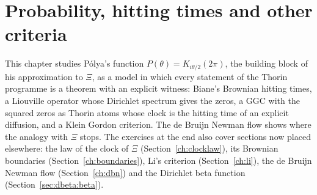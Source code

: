 \chapter{Probability, hitting times and other criteria}\label{chap:probability}

This chapter studies P\'olya's function $P(\theta)=K_{i\theta/2}(2\pi)$, the building block of his approximation to $\Xi$, as a model in which every statement of the Thorin programme is a theorem with an explicit witness: Biane's Brownian hitting times, a Liouville operator whose Dirichlet spectrum gives the zeros, a GGC with the squared zeros as Thorin atoms whose clock is the hitting time of an explicit diffusion, and a Klein Gordon criterion. The de Bruijn Newman flow shows where the analogy with $\Xi$ stops. The exercises at the end also cover sections now placed elsewhere: the law of the clock of $\Xi$ (Section~\ref{ch:clocklaw}), its Brownian boundaries (Section~\ref{ch:boundaries}), Li's criterion (Section~\ref{ch:li}), the de Bruijn Newman flow (Section~\ref{ch:dbn}) and the Dirichlet beta function (Section~\ref{sec:dbeta:beta}).
